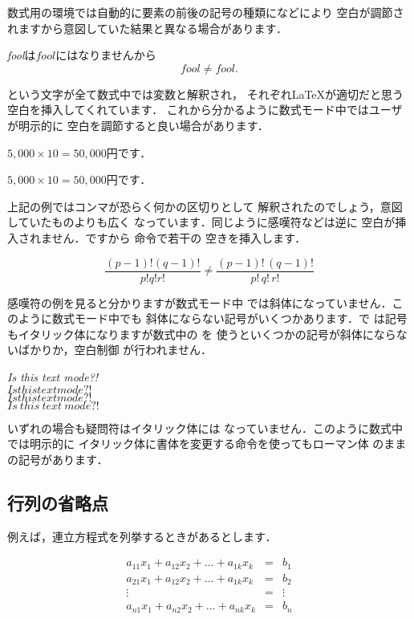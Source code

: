 数式用の環境では自動的に要素の前後の記号の種類になどにより
空白が調節されますから意図していた結果と異なる場合があります．
\begin{InOut}
\emph{fool}は\(fool\)にはなりませんから
\[ fool \neq \mathit{fool}. \]
\end{InOut}
という文字が全て数式中では変数と解釈され，
それぞれ{\LaTeX}が適切だと思う空白を挿入してくれています．
これから分かるように数式モード中ではユーザが明示的に
空白を調節すると良い場合があります．
\begin{InOut}
$5,000\times10=50,000$円です．\par
$5{,}000\times10=50{,}000$円です．
\end{InOut}
上記の例ではコンマ\qu{\str,}が恐らく何かの区切りとして
解釈されたのでしょう，意図していたものよりも広く
なっています．同じように感嘆符\qu{\str{!}}などは逆に
空白が挿入されません．ですから \cmd{,}命令で若干の
空きを挿入します．
\begin{InOut}
\[  \frac{(p - 1)! (q - 1)!}
  {p! q! r!} \neq 
\frac{(p - 1)!\,(q - 1)!}
  {p!\,q!\,r!}  \]
\end{InOut}
感嘆符\qu{\str!}の例を見ると分かりますが数式モード中
では斜体になっていません．このように数式モード中でも
斜体にならない記号がいくつかあります．で
は記号もイタリック体になりますが数式中の を
使うといくつかの記号が斜体にならないばかりか，空白制御
が行われません．
\begin{InOut}
\usepackage{amsmath}
\newcommand*\temptxt{Is this text 
   mode?!}
\textit{\temptxt}\\
\(\mathit{\temptxt}\)\\
\(\temptxt\)\\
\(\mathit{Is\ this\ text\ 
   mode?!}\)
\end{InOut}
いずれの場合も疑問符はイタリック体には
なっていません．このように数式中では明示的に
イタリック体に書体を変更する命令を使ってもローマン体
のままの記号があります．

\subsection{行列の省略点}

例えば，連立方程式を列挙するときがあるとします．
\begin{InOut}
\begin{eqnarray}
 a_{11}x_1 + a_{12}x_2 + \dots + 
 a_{1k}x_k & = & b_1 \nonumber \\
 a_{21}x_1 + a_{12}x_2 + \dots + 
 a_{1k}x_k & = & b_2 \nonumber \\
  \vdots   & = & \vdots \nonumber\\
 a_{n1}x_1 + a_{n2}x_2 + \dots + 
 a_{nk}x_k & = & b_n  \nonumber
\end{eqnarray}
\end{InOut}

